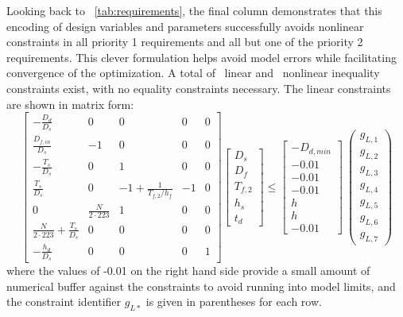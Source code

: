Looking back to \tablename~\ref{tab:requirements}, the final column demonstrates that this encoding of design variables and parameters successfully avoids nonlinear constraints in all priority 1 requirements and all but one of the priority 2 requirements. This clever formulation helps avoid model errors while facilitating convergence of the optimization. A total of \numLinConstraints~linear and \numNonlinConstraints~nonlinear inequality constraints exist, with no equality constraints necessary. The linear constraints are shown in matrix form:
\begin{equation}
    \begin{bmatrix}
    -\frac{D_d}{D_s} & 0 & 0 & 0 & 0\\
    \frac{D_{f,in}}{D_s} & -1 & 0 & 0& 0 \\
    -\frac{T_s}{D_s} & 0 & 1 & 0& 0 \\
    \frac{T_s}{D_s} & 0 & -1+\frac{1}{T_{f,2}/h_f} & -1 & 0\\
    0 & \frac{N}{2\cdot223} & 1 & 0& 0 \\
    \frac{N}{2\cdot223}  + \frac{T_s}{D_s} & 0 & 0 & 0 & 0\\
    -\frac{h_d}{D_s} & 0 & 0 & 0 & 1
    \end{bmatrix}
    \begin{bmatrix} D_s \\ D_f \\ T_{f,2} \\ h_s \\ t_d
    \end{bmatrix}
    \leq
    \begin{bmatrix}
    -D_{d,min} \\ -0.01 \\ -0.01 \\ -0.01 \\ h \\ h \\ -0.01
    \end{bmatrix}~
    \begin{pmatrix}
    g_{L,1} \\ g_{L,2} \\ g_{L,3} \\g_{L,4} \\ g_{L,5} \\ g_{L,6} \\ g_{L,7}
    \end{pmatrix}
\end{equation}
where the values of -0.01 on the right hand side provide a small amount of numerical buffer against the constraints to avoid running into model limits, and the constraint identifier $g_{L*}$ is given in parentheses for each row.

